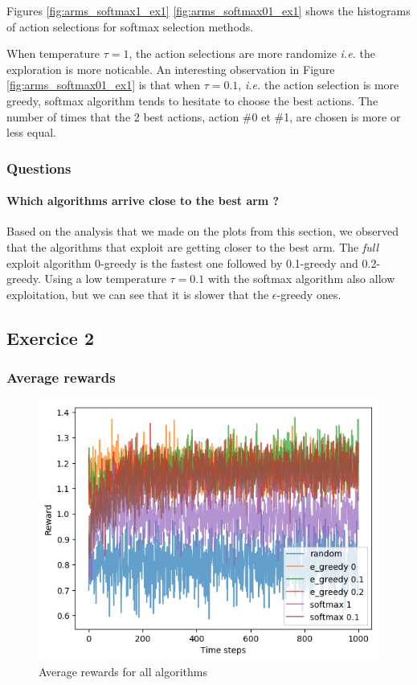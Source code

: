 \documentclass[letterpaper]{article}
\begin{document}
Figures \ref{fig:arms_softmax1_ex1} \ref{fig:arms_softmax01_ex1}
shows the histograms of action selections
for softmax selection methods.

When temperature $\tau = 1$, the action selections are more randomize
\textit{i.e.} the exploration is more noticable. An interesting observation
in Figure \ref{fig:arms_softmax01_ex1}
is that when $\tau = 0.1$, \textit{i.e.}
the action selection is more greedy, softmax
algorithm tends to hesitate to choose the best actions. The
number of times that the 2 best actions,
action \#0 et \#1, are chosen is more or less equal.

\subsubsection{Questions}

\paragraph{
Which algorithms arrive close to the best arm ?
}

Based on the analysis that we made on the plots from this section,
we observed that the algorithms that exploit are getting closer to
the best arm. The \textit{full} exploit algorithm 0-greedy is the
fastest one followed by 0.1-greedy and 0.2-greedy. Using a low
temperature $\tau = 0.1$ with the softmax algorithm also allow exploitation,
but we can see that it is slower that the $\epsilon$-greedy ones.


\subsection{Exercice 2}

\subsubsection{Average rewards}

\begin{figure}[H]
    \centering
    \includegraphics[width=.7\linewidth]{images/assign3/ex2/rewards}
    \caption{Average rewards for all algorithms}
    \label{fig:rewards_ex2}
\end{figure}
\end{document}
